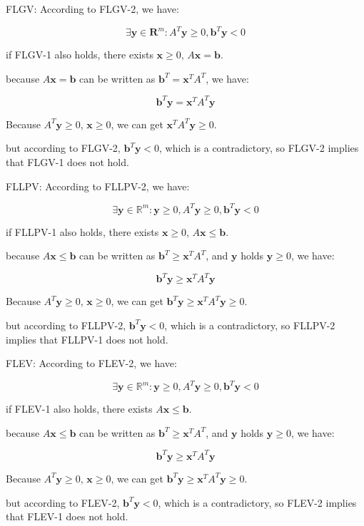     FLGV: According to FLGV-2, we have:

    \[\exists \textbf{y} \in \textbf{R}^{m}: A^{T}\textbf{y} \geq 0, \textbf{b}^{T}\textbf{y} < 0 \]

    if FLGV-1 also holds, there exists $\textbf{x} \geq 0$, $A\textbf{x}=\textbf{b}$.

    because $A\textbf{x}=\textbf{b}$ can be written as $\textbf{b}^{T} = \textbf{x}^{T}A^{T}$, we have:

    \[\textbf{b}^{T}\textbf{y}=\textbf{x}^{T}A^{T}\textbf{y}\]

    Because $A^{T}\textbf{y} \geq 0$, $\textbf{x} \geq 0$, we can get $\textbf{x}^{T}A^{T}\textbf{y} \geq 0$.

    but according to FLGV-2, $\textbf{b}^{T}\textbf{y} < 0$, which is a contradictory, so FLGV-2 implies that FLGV-1 does not hold.

    FLLPV: According to FLLPV-2, we have:

    \[\exists \textbf{y} \in \mathbb{R}^{m}: \textbf{y} \geq 0, A^{T}\textbf{y} \geq 0, \textbf{b}^{T}\textbf{y} < 0 \]

    if FLLPV-1 also holds, there exists $\textbf{x} \geq 0$, $A\textbf{x} \leq \textbf{b}$.

    because $A\textbf{x} \leq \textbf{b}$ can be written as $\textbf{b}^{T} \geq \textbf{x}^{T}A^{T}$, and $\textbf{y}$ holds $\textbf{y} \geq 0$, we have:

    \[\textbf{b}^{T}\textbf{y} \geq \textbf{x}^{T}A^{T}\textbf{y}\]

    Because $A^{T}\textbf{y} \geq 0$, $\textbf{x} \geq 0$, we can get $\textbf{b}^{T}\textbf{y} \geq \textbf{x}^{T}A^{T}\textbf{y} \geq 0$.

    but according to FLLPV-2, $\textbf{b}^{T}\textbf{y} < 0$, which is a contradictory, so FLLPV-2 implies that FLLPV-1 does not hold.

    FLEV: According to FLEV-2, we have:

    \[\exists \textbf{y} \in \mathbb{R}^{m}: \textbf{y} \geq 0, A^{T}\textbf{y} \geq 0, \textbf{b}^{T}\textbf{y} < 0 \]

    if FLEV-1 also holds, there exists $A\textbf{x} \leq \textbf{b}$.

    because $A\textbf{x} \leq \textbf{b}$ can be written as $\textbf{b}^{T} \geq \textbf{x}^{T}A^{T}$, and $\textbf{y}$ holds $\textbf{y} \geq 0$, we have:

    \[\textbf{b}^{T}\textbf{y} \geq \textbf{x}^{T}A^{T}\textbf{y}\]

    Because $A^{T}\textbf{y} \geq 0$, $\textbf{x} \geq 0$, we can get $\textbf{b}^{T}\textbf{y} \geq \textbf{x}^{T}A^{T}\textbf{y} \geq 0$.

    but according to FLEV-2, $\textbf{b}^{T}\textbf{y} < 0$, which is a contradictory, so FLEV-2 implies that FLEV-1 does not hold. 